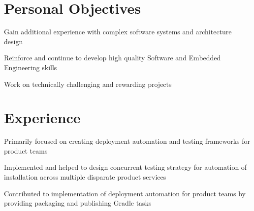 \documentclass[letterpaper]{deedy-resume} %
\begin{document}
\hfill
%
%
\begin{minipage}[t]{0.66\textwidth} %


\section{Personal Objectives}
\vspace{\topsep} %
\begin{tightitemize}
\item Gain additional experience with complex software systems and architecture design
\item Reinforce and continue to develop high quality Software and Embedded Engineering skills
\item Work on technically challenging and rewarding projects
\end{tightitemize}


\section{Experience}


\begin{tightitemize}
\item Primarily focused on creating deployment automation and testing frameworks for product teams
\item Implemented and helped to design concurrent testing strategy for automation of installation across multiple disparate product services
\item Contributed to implementation of deployment automation for product teams by providing packaging and publishing Gradle tasks
\end{tightitemize}


\end{minipage}
\end{document}
